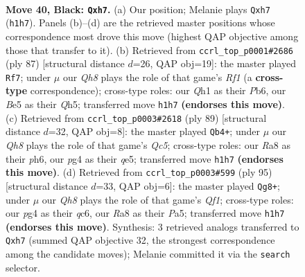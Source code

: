 \documentclass[11pt]{article}
\begin{document}
\clearpage

\begin{figure}[p]\centering
\begin{subfigure}{0.46\textwidth}\centering
\resizebox{\linewidth}{!}{%
\newchessgame
\chessboard[
  setfen={r7/p6Q/2k1p3/p2pb1K1/6P1/3P4/8/7q b - - 4 40},
  showmover=false,
  pgfstyle=straightmove, color=movearrow, markmove={h1-h7}
]}
\caption{}
\end{subfigure}\hfill
\begin{subfigure}{0.46\textwidth}\centering
\resizebox{\linewidth}{!}{%
\newchessgame
\chessboard[
  setfen={5r2/7k/1p5p/5p1q/1Q6/6P1/6P1/R5K1 b - - 2 44},
  showmover=false,
  pgfstyle=straightmove, color=movearrow, markmove={f8-f7}
]}
\caption{}
\end{subfigure}
\\[4pt]
\begin{subfigure}{0.46\textwidth}\centering
\resizebox{\linewidth}{!}{%
\newchessgame
\chessboard[
  setfen={8/kp5p/1p5P/1p2Q3/2q5/8/2PK1P2/8 b - - 6 45},
  showmover=false,
  pgfstyle=straightmove, color=movearrow, markmove={c4-b4}
]}
\caption{}
\end{subfigure}\hfill
\begin{subfigure}{0.46\textwidth}\centering
\resizebox{\linewidth}{!}{%
\newchessgame
\chessboard[
  setfen={5q1k/7p/2Q4p/p4P2/8/2p4P/P4PK1/8 b - - 1 48},
  showmover=false,
  pgfstyle=straightmove, color=movearrow, markmove={f8-g8}
]}
\caption{}
\end{subfigure}
\caption{\textbf{Move 40, Black: \texttt{Qxh7}.} (a) Our position; Melanie plays \texttt{Qxh7} (\texttt{h1h7}). Panels (b)--(d) are the retrieved master positions whose correspondence most drove this move (highest QAP objective among those that transfer to it). (b) Retrieved from \texttt{ccrl\_top\_p0001\#2686} (ply 87) [structural distance $d$=26, QAP obj=19]: the master played \texttt{Rf7}; under $\mu$ our \emph{Qh8} plays the role of that game's \emph{Rf1} (a \textbf{cross-type} correspondence); cross-type roles: our \emph{Q}h1 as their \emph{P}b6, our \emph{B}e5 as their \emph{Q}h5; transferred move \texttt{h1h7} \textbf{(endorses this move)}. (c) Retrieved from \texttt{ccrl\_top\_p0003\#2618} (ply 89) [structural distance $d$=32, QAP obj=8]: the master played \texttt{Qb4+}; under $\mu$ our \emph{Qh8} plays the role of that game's \emph{Qc5}; cross-type roles: our \emph{R}a8 as their \emph{p}h6, our \emph{p}g4 as their \emph{q}e5; transferred move \texttt{h1h7} \textbf{(endorses this move)}. (d) Retrieved from \texttt{ccrl\_top\_p0003\#599} (ply 95) [structural distance $d$=33, QAP obj=6]: the master played \texttt{Qg8+}; under $\mu$ our \emph{Qh8} plays the role of that game's \emph{Qf1}; cross-type roles: our \emph{p}g4 as their \emph{q}c6, our \emph{R}a8 as their \emph{P}a5; transferred move \texttt{h1h7} \textbf{(endorses this move)}. Synthesis: 3 retrieved analogs transferred to \texttt{Qxh7} (summed QAP objective 32, the strongest correspondence among the candidate moves); Melanie committed it via the \texttt{search} selector.}
\label{fig:thought-m79}
\end{figure}
\end{document}
